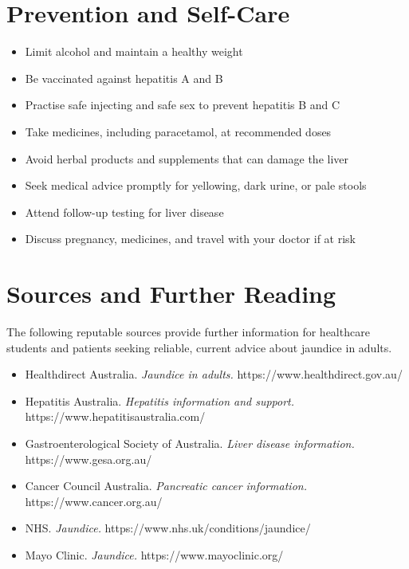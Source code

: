 \section*{Prevention and Self-Care}
\begin{itemize}
    \item Limit alcohol and maintain a healthy weight
    \item Be vaccinated against hepatitis A and B
    \item Practise safe injecting and safe sex to prevent hepatitis B and C
    \item Take medicines, including paracetamol, at recommended doses
    \item Avoid herbal products and supplements that can damage the liver
    \item Seek medical advice promptly for yellowing, dark urine, or pale stools
    \item Attend follow-up testing for liver disease
    \item Discuss pregnancy, medicines, and travel with your doctor if at risk
\end{itemize}

\section*{Sources and Further Reading}
The following reputable sources provide further information for healthcare students and patients seeking reliable, current advice about jaundice in adults.
\begin{itemize}
    \item Healthdirect Australia. \textit{Jaundice in adults.} https://www.healthdirect.gov.au/
    \item Hepatitis Australia. \textit{Hepatitis information and support.} https://www.hepatitisaustralia.com/
    \item Gastroenterological Society of Australia. \textit{Liver disease information.} https://www.gesa.org.au/
    \item Cancer Council Australia. \textit{Pancreatic cancer information.} https://www.cancer.org.au/
    \item NHS. \textit{Jaundice.} https://www.nhs.uk/conditions/jaundice/
    \item Mayo Clinic. \textit{Jaundice.} https://www.mayoclinic.org/
\end{itemize}
